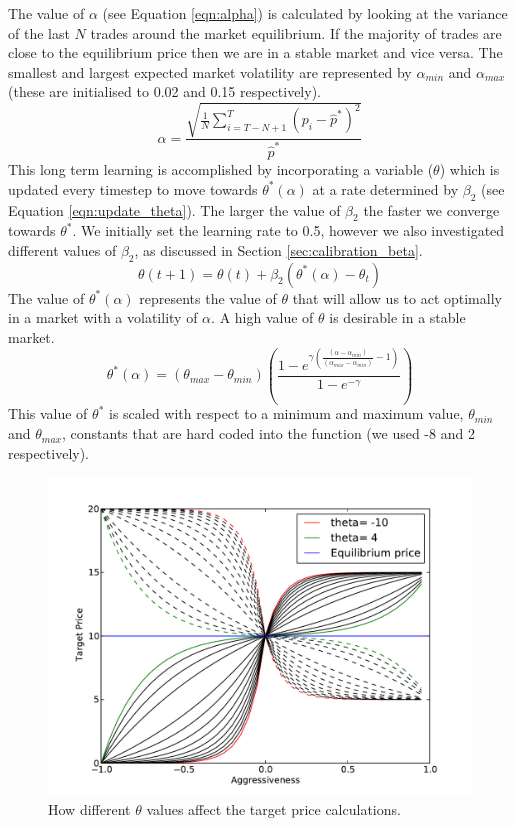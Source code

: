 \documentclass[preprint]{acm_proc_article-sp} %
\begin{document}
The  value of $\alpha$ (see Equation \ref{eqn:alpha}) is calculated
by looking at the variance of the last $N$ trades around the market equilibrium.
If the majority of trades are close to the equilibrium price then we are in
a stable market and vice versa. The smallest and largest expected market volatility are represented 
by $\alpha_{min}$ and $\alpha_{max}$ (these are initialised to 0.02 and 0.15 respectively).
\begin{equation}
  \alpha = \frac{\sqrt{\frac 1 N \sum^T_{i=T-N+1}(p_i-\hat p^*)^2}}{\hat p^*}
  \label{eqn:alpha}
\end{equation}
This long term learning is accomplished by incorporating a variable ($\theta$) which is updated every
timestep to move towards $\theta^*(\alpha)$ at a rate determined by $\beta_2$ (see Equation \ref{eqn:update_theta}).
The larger the value of $\beta_2$ the faster we converge towards $\theta^*$. We initially set the 
learning rate to 0.5, however we also investigated different values of $\beta_2$, as discussed in 
Section \ref{sec:calibration_beta}.
\begin{equation}
  \theta(t+1)=\theta(t)+\beta_2(\theta^*(\alpha)-\theta_t)
  \label{eqn:update_theta}
\end{equation}
The value of $\theta^*(\alpha)$ represents the value of $\theta$ that will allow us to act optimally in a
market with a volatility of $\alpha$. A high value of $\theta$ is desirable in a stable market.
\begin{equation}
  \theta^*(\alpha) = (\theta_{max}-\theta_{min})
  \left(\frac{1-e^{\gamma\left(\frac{(\alpha-\alpha_{min})}{(\alpha_{max}
  -\alpha_{min})}-1\right)}}{1-e^{-\gamma}}\right)
  \label{thetastar}
\end{equation}
This value of $\theta^*$ is scaled with
respect to a minimum and maximum value, $\theta_{min}$ and $\theta_{max}$, constants that are hard coded into the
function (we used -8 and 2 respectively).

\begin{figure}[H]
  \centering
  \includegraphics[width=\columnwidth]{graphs_and_stats/graph_thetas.pdf}
  \caption{How different $\theta$ values affect the target price calculations.}
  \label{fig:theta}
\end{figure}
\end{document}

